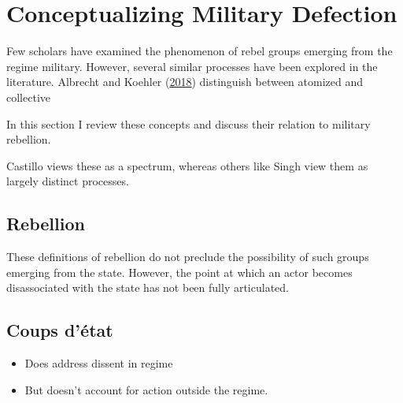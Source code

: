 \documentclass[
  12pt,
]{article}
\providecommand{\tightlist}{%
  \setlength{\itemsep}{0pt}\setlength{\parskip}{0pt}}
\begin{document}
\hypertarget{conceptualizing-military-defection}{%
\section{Conceptualizing Military Defection}\label{conceptualizing-military-defection}}

Few scholars have examined the phenomenon of rebel groups emerging from the regime military. However, several similar processes have been explored in the literature. Albrecht and Koehler (\protect\hyperlink{ref-Albrecht2018}{2018}) distinguish between atomized and collective

In this section I review these concepts and discuss their relation to military rebellion.

Castillo views these as a spectrum, whereas others like Singh view them as largely distinct processes.

\hypertarget{rebellion}{%
\subsection{Rebellion}\label{rebellion}}

These definitions of rebellion do not preclude the possibility of such groups emerging from the state. However, the point at which an actor becomes disassociated with the state has not been fully articulated.

\hypertarget{coups-duxe9tat}{%
\subsection{Coups d'état}\label{coups-duxe9tat}}

\begin{itemize}
\tightlist
\item
  Does address dissent in regime
\item
  But doesn't account for action outside the regime.
\end{itemize}
\end{document}
